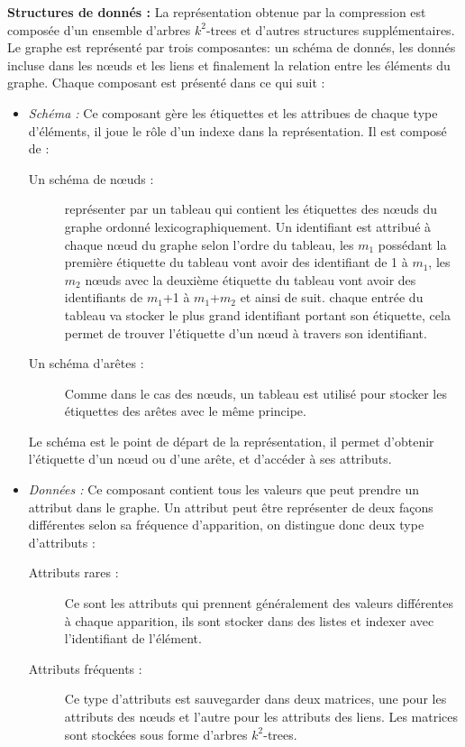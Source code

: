 \textbf{Structures de donnés :} La représentation obtenue par la compression est composée d'un ensemble d'arbres $k^2$-trees et d'autres structures supplémentaires. Le graphe est représenté par trois composantes: un schéma de donnés, les donnés incluse dans les nœuds et les liens et finalement la relation entre les éléments du graphe. Chaque composant est présenté dans ce qui suit :
\begin{itemize}
\item \textit{Schéma : } Ce composant gère les étiquettes et les attribues de chaque type d'éléments, il joue le rôle d'un indexe dans la représentation. Il est composé de :
\begin{description}
\item[Un schéma de nœuds :] représenter par un tableau qui contient les étiquettes des nœuds du graphe ordonné lexicographiquement. Un identifiant est attribué à chaque nœud du graphe selon l'ordre du tableau, les \textit{$m_1$} possédant la première étiquette du tableau vont avoir des identifiant de 1 à \textit{$m_1$}, les \textit{$m_2$} nœuds avec la deuxième étiquette du tableau vont avoir des identifiants de \textit{$m_1$}+1 à \textit{$m_1$}+\textit{$m_2$} et ainsi de suit. chaque entrée du tableau va stocker le plus grand identifiant portant son étiquette, cela permet de trouver l'étiquette d'un nœud à travers son identifiant.
\item[Un schéma d'arêtes :] Comme dans le cas des nœuds, un tableau est utilisé pour stocker les étiquettes des arêtes avec le même principe.  
\end{description}
Le schéma est le point de départ de la représentation, il permet d'obtenir l'étiquette d'un nœud ou d'une arête, et d'accéder à ses attributs.
\item \textit{Données :} Ce composant contient tous les valeurs que peut prendre un attribut dans le graphe. Un attribut peut être représenter de deux façons différentes selon sa fréquence d'apparition, on distingue donc deux type d'attributs :
\begin{description}
\item[Attributs rares :] Ce sont les attributs qui prennent généralement des valeurs différentes à chaque apparition, ils sont stocker dans des listes et indexer avec l'identifiant de l'élément.
\item[Attributs fréquents :] Ce type d'attributs est sauvegarder dans deux matrices, une pour les attributs des nœuds et l'autre pour les attributs des liens. Les matrices sont stockées sous forme d'arbres $k^2$-trees.

\end{description}
\end{itemize}
